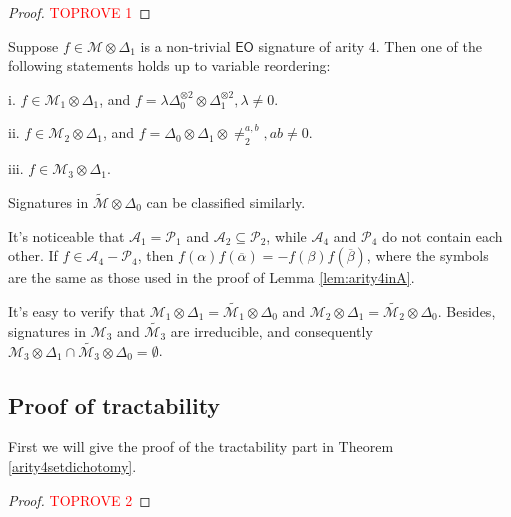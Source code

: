 \documentclass[a4paper,UKenglish,cleveref, autoref, thm-restate]{lipics-v2021}
\newcommand{\eo}[0]{\textsf{EO}}
\begin{document}
\begin{proof}\textcolor{red}{TOPROVE 1}\end{proof}

\begin{lemma}\label{lem:arity4inM}
Suppose $f\in \mathscr{M}\otimes\Delta_1$ is a non-trivial $\eo$ signature of arity 4. Then one of the following statements holds up to variable reordering:

i. $f\in\mathscr{M}_1\otimes\Delta_1$, and $f=\lambda\Delta_0^{\otimes2}\otimes\Delta_1^{\otimes2},\lambda\neq0$. 


ii. $f\in\mathscr{M}_2\otimes\Delta_1$, and $f=\Delta_0\otimes\Delta_1\otimes\neq_2^{a,b}, ab\neq0$.

iii. $f\in\mathscr{M}_3\otimes\Delta_1$.

Signatures in $\widetilde{\mathscr{M}}\otimes\Delta_0$ can be classified similarly.
\end{lemma}


\begin{remark}\label{remarkA4-P4}
It's noticeable that $\mathscr{A}_1=\mathscr{P}_1$ and $\mathscr{A}_2\subseteq\mathscr{P}_2$, while $\mathscr{A}_4$ and $\mathscr{P}_4$ do not contain each other. If $f\in\mathscr{A}_4-\mathscr{P}_4$, then $f(\alpha)f(\overline{\alpha})=-f(\beta)f(\overline{\beta})$, where the symbols are the same as those used in the proof of Lemma \ref{lem:arity4inA}.
\end{remark}

\begin{remark}\label{remark:difference between M and M'}


It's easy to verify that $\mathscr{M}_1\otimes\Delta_1=\widetilde{\mathscr{M}_1}\otimes\Delta_0$ and $\mathscr{M}_2\otimes\Delta_1=\widetilde{\mathscr{M}_2}\otimes\Delta_0$. Besides, signatures in $\mathscr{M}_3$ and $\widetilde{\mathscr{M}_3}$ are irreducible, and consequently $\mathscr{M}_3\otimes\Delta_1\cap\widetilde{\mathscr{M}_3}\otimes\Delta_0=\emptyset$.
\end{remark}

\subsection{Proof of tractability} \label{subsection:4aritysetalgorithm}
First we will give the proof of the tractability part in Theorem \ref{arity4setdichotomy}.
\begin{proof}\textcolor{red}{TOPROVE 2}\end{proof}
\end{document}
